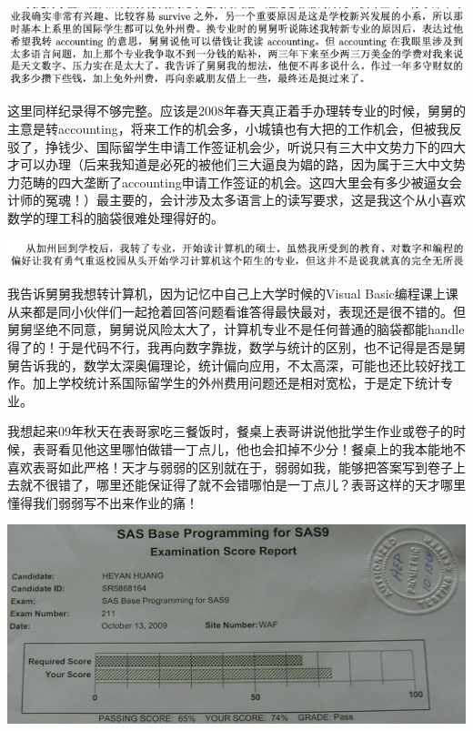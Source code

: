 \documentclass[9pt, b5paper]{article}
\begin{document}
\begin{center}
\includegraphics[width=.9\linewidth]{./pic/backups_plans_20210414_161250.png}
\end{center}

这里同样纪录得不够完整。应该是2008年春天真正着手办理转专业的时候，舅舅的主意是转accounting，将来工作的机会多，小城镇也有大把的工作机会，但被我反驳了，挣钱少、国际留学生申请工作签证机会少，听说只有三大中文势力下的四大才可以办理（后来我知道是必死的被他们三大逼良为娼的路，因为属于三大中文势力范畴的四大垄断了accounting申请工作签证的机会。这四大里会有多少被逼女会计师的冤魂！）最主要的，会计涉及太多语言上的读写要求，这是我这个从小喜欢数学的理工科的脑袋很难处理得好的。

\begin{center}
\includegraphics[width=.9\linewidth]{./pic/backups_plans_20210414_171951.png}
\end{center}

我告诉舅舅我想转计算机，因为记忆中自己上大学时候的Visual Basic编程课上课从来都是同小伙伴们一起抢着回答问题看谁答得最快最对，表现还是很不错的。但舅舅坚绝不同意，舅舅说风险太大了，计算机专业不是任何普通的脑袋都能handle得了的！于是代码不行，我再向数字靠拢，数学与统计的区别，也不记得是否是舅舅告诉我的，数学太深奥偏理论，统计偏向应用，不太高深，可能也还比较好找工作。加上学校统计系国际留学生的外州费用问题还是相对宽松，于是定下统计专业。 

我想起来09年秋天在表哥家吃三餐饭时，餐桌上表哥讲说他批学生作业或卷子的时候，表哥看见他这里哪怕做错一丁点儿，他也会扣掉不少分！餐桌上的我本能地不喜欢表哥如此严格！天才与弱弱的区别就在于，弱弱如我，能够把答案写到卷子上去就不很错了，哪里还能保证得了就不会错哪怕是一丁点儿？表哥这样的天才哪里懂得我们弱弱写不出来作业的痛！

\begin{center}
\includegraphics[width=.9\linewidth]{./pic/backups_plans_20210414_190557.png}
\end{center}
\end{document}
